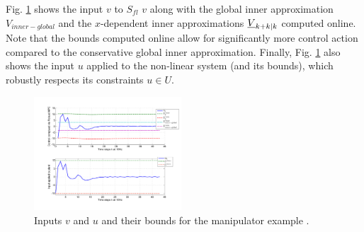 

Fig. \ref{fig:v_and_limits} shows the input $v$ to $S_{fl}$ $v$ along with the global inner approximation $V_{inner-global}$ and the $x$-dependent inner approximations $\underline{V}_{k+k|k}$ computed online.
Note that the bounds computed online allow for significantly more control action compared to the conservative global inner approximation. 
Finally, Fig. \ref{fig:v_and_limits} also shows the input $u$ applied to the non-linear system (and its bounds), which robustly respects its constraints $u \in U$.



\begin{figure}
\includegraphics[width=0.49\textwidth]{figs/u_and_v_manip.pdf}
\caption{Inputs $v$ and $u$ and their bounds for the manipulator example .}
\label{fig:v_and_limits}
\end{figure}






